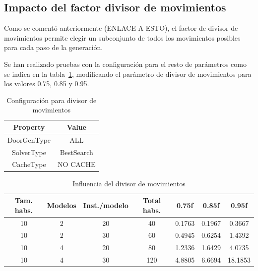 \subsection{Impacto del factor divisor de movimientos}

Como se comentó anteriormente (ENLACE A ESTO), el factor de divisor de movimientos permite elegir un subconjunto de todos los movimientos posibles para cada paso de la generación.

Se han realizado pruebas con la configuración para el resto de parámetros como se indica en la tabla~\ref{table:cfgdpediv}, modificando el parámetro de divisor de movimientos para los valores 0.75, 0.85 y 0.95.

\begin{table}[H]
\begin{center}
	\begin{tabular}{ | c | c | }
\hline
 		Property & Value \\ \hline
DoorGenType & ALL \\ 
SolverType & BestSearch \\ 
CacheType & NO CACHE \\ 
\hline
	\end{tabular}
\end{center}
\caption{Configuración para divisor de movimientos}
\label{table:cfgdpediv}
\end{table}

\begin{table}[H]
\begin{center}
	\begin{tabular}{ | c | c | c | c | c | c | c | }
\hline
Tam. habs. & Modelos & Inst./modelo & Total habs. & 0.75f & 0.85f & 0.95f\\ \hline 
10 & 2 & 20 & 40 & 0.1763 & 0.1967 & 0.3667 \\ 
10 & 2 & 30 & 60 & 0.4945 & 0.6254 & 1.4392 \\ 
10 & 4 & 20 & 80 & 1.2336 & 1.6429 & 4.0735 \\ 
10 & 4 & 30 & 120 & 4.8805 & 6.6694 & 18.1853 \\ 
\hline
	\end{tabular}
\end{center}
\caption{Influencia del divisor de movimientos}
\label{table:dpediv}
\end{table}


